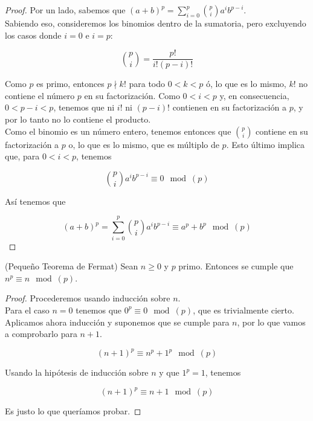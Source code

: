 \begin{proof}
	Por un lado, sabemos que $(a + b)^p = \sum_{i=0}^{p}\binom{p}{i}a^ib^{p-i}$.\\
	
	Sabiendo eso, consideremos los binomios dentro de la sumatoria, pero excluyendo los casos donde $i = 0$ e $i = p$:
	
	\[ \binom{p}{i} = \frac{p!}{i!(p - i)!} \]
	
	Como $p$ es primo, entonces $p \nmid k!$ para todo $0 < k < p$ ó, lo que es lo mismo, $k!$ no contiene el número $p$ en su factorización. Como $0 < i < p$ y, en consecuencia, $0 < p - i < p$, tenemos que ni $i!$ ni $(p - i)!$ contienen en su factorización a $p$, y por lo tanto no lo contiene el producto.\\
	
	Como el binomio es un número entero, tenemos entonces que $\binom{p}{i}$ contiene en su factorización a $p$ o, lo que es lo mismo, que es múltiplo de $p$. Esto último implica que, para $0 < i < p$, tenemos
	
	\[ \binom{p}{i}a^ib^{p-i} \equiv 0 \mod(p) \]
	
	Así tenemos que
	
	\[ (a + b)^p = \sum_{i=0}^{p}\binom{p}{i}a^ib^{p-i} \equiv a^p + b^p \mod(p) \]
\end{proof}

\begin{teorema}{(Pequeño Teorema de Fermat)}\label{pequenio_teorema_de_fermat}
	Sean $n \geq 0$ y $p$ primo. Entonces se cumple que $n^p \equiv n \mod(p)$.
\end{teorema}

\begin{proof}
	Procederemos usando inducción sobre $n$.\\
	
	Para el caso $n = 0$ tenemos que $0^p \equiv 0 \mod(p)$, que es trivialmente cierto.\\
	
	Aplicamos ahora inducción y suponemos que se cumple para $n$, por lo que vamos a comprobarlo para $n + 1$.
	
	\[ (n + 1)^p \equiv n^p + 1^p \mod(p) \]
	
	Usando la hipótesis de inducción sobre $n$ y que $1^p = 1$, tenemos
	
	\[ (n + 1)^p \equiv n + 1 \mod(p) \]
	
	Es justo lo que queríamos probar.
\end{proof}

